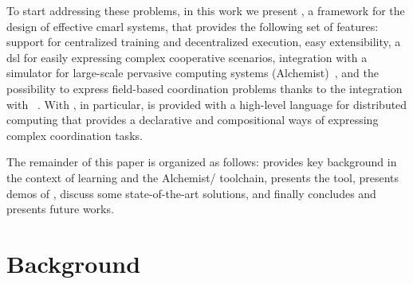 To start addressing these problems, in this work we present \scarlib{}, a framework for the design of effective \ac{cmarl} systems, that 
 provides the following set of features:
 support for centralized training and decentralized execution, 
 easy extensibility, 
 a \ac{dsl} for easily expressing complex cooperative scenarios, 
 integration with a simulator for large-scale pervasive computing systems (Alchemist)~\cite{DBLP:journals/jos/PianiniMV13},
 and the possibility to express field-based coordination problems thanks to the integration with \scafi{}~\cite{Casadei2022}.
%
With \scafi{}, in particular, \scarlib{} is provided with a high-level language for distributed computing that provides a declarative
 and compositional ways of expressing complex coordination tasks. 

The remainder of this paper is organized as follows:  provides key background in the context of learning and the Alchemist/\scafi{} toolchain,  presents the \scarlib{} tool,  presents demos of \scarlib{},  discuss some state-of-the-art solutions, and finally  concludes and presents future works.
%
\section{Background}\label{background} %

